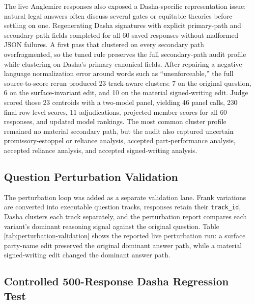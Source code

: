 The live Anglemire responses also exposed a Dasha-specific representation
issue: natural legal answers often discuss several gates or equitable theories
before settling on one. Regenerating Dasha signatures with explicit
primary-path and secondary-path fields completed for all 60 saved responses
without malformed JSON failures. A first pass that clustered on every
secondary path overfragmented, so the tuned rule preserves the full
secondary-path audit profile while clustering on Dasha's primary canonical
fields. After repairing a negative-language normalization error around words
such as ``unenforceable,'' the full source-to-score rerun produced 23
track-aware clusters: 7 on the original question, 6 on the surface-invariant
edit, and 10 on the material signed-writing edit. Judge scored those 23
centroids with a two-model panel, yielding 46 panel calls, 230 final
row-level scores, 11 adjudications, projected member scores for all 60
responses, and updated model rankings. The most common cluster profile remained
no material secondary path, but the audit also captured uncertain
promissory-estoppel or reliance analysis, accepted part-performance analysis,
accepted reliance analysis, and accepted signed-writing analysis.

\subsection{Question Perturbation Validation}

The perturbation loop was added as a separate validation lane. Frank variations
are converted into executable question tracks, responses retain their
\texttt{track\_id}, Dasha clusters each track separately, and the perturbation
report compares each variant's dominant reasoning signal against the original
question. Table \ref{tab:perturbation-validation} shows the reported live
perturbation run: a surface party-name edit preserved the original dominant
answer path, while a material signed-writing edit changed the dominant answer
path.

\begin{table}[h]
\centering
\caption{Perturbation validation for the live model batch.}
\label{tab:perturbation-validation}

\end{table}

\subsection{Controlled 500-Response Dasha Regression Test}

